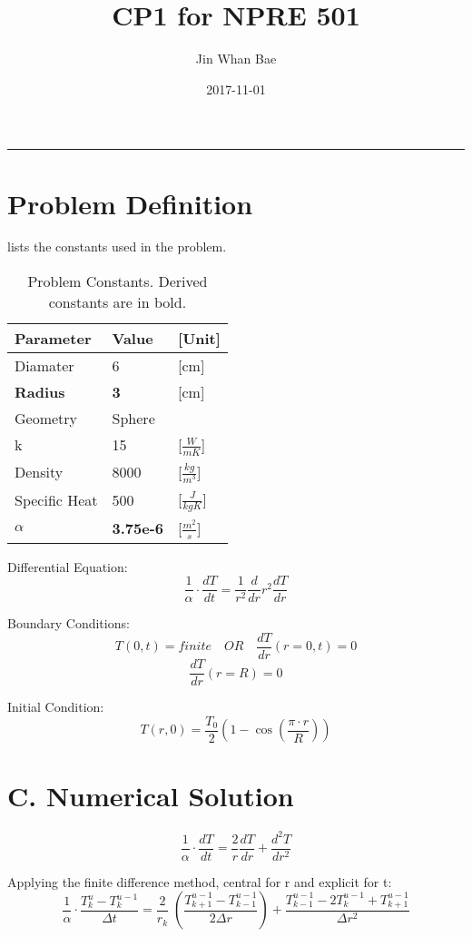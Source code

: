 \documentclass[12pt,letterpaper]{article}
\title{CP1 for NPRE 501}
\author{Jin Whan Bae}
\date{2017-11-01}
\begin{document}
	
	\maketitle
	\hrule
	\onehalfspacing
	\thispagestyle{empty}

\section{Problem Definition}

 lists the constants used in the problem.


\begin{table}[h]
     \centering
    \begin{tabularx}{\textwidth}{bbb}
       \hline
       Parameter & Value & [Unit] \\
       \hline
       Diamater & 6 & [cm] \\
       \textbf{Radius} & \textbf{3} & [cm] \\
       Geometry & Sphere \\
       k & 15 & [$ \frac{W}{mK} $] \\
       Density & 8000 & [$ \frac{kg}{m^3} $] \\
       Specific Heat & 500 & [$ \frac{J}{kgK} $] \\
       \textbf{$ \alpha$} & \textbf{3.75e-6} & [$ \frac{m^2}{s} $] \\
       \hline
    \end{tabularx}
    \caption {Problem Constants. Derived constants are in bold.}
    \label{tab:constants}
\end{table}

Differential Equation:
\[\frac{1}{\alpha} \cdot \frac{dT}{dt} = \frac{1}{r^2} \frac{d}{dr} r^2 \frac{dT}{dr}\]

Boundary Conditions:
\[T(0,t) = finite \quad OR \quad \frac{dT}{dr} (r = 0, t) = 0\]
\[\frac{dT}{dr} (r = R) = 0 \]

Initial Condition:
\[T(r,0) = \frac{T_0}{2} (1-\cos{(\frac{\pi \cdot r}{R})}) \]

\section{C. Numerical Solution}


\[\frac{1}{\alpha} \cdot \frac{dT}{dt} = \frac{2}{r} \frac{dT}{dr} + \frac{d^2T}{dr^2}\]

Applying the finite difference method, central for r and explicit for t:
\[\frac{1}{\alpha} \cdot \frac{T_k^{u} - T_k^{u-1}}{\Delta t} = \frac{2}{r_k} \; (\frac{T^{u-1}_{k+1}-T^{u-1}_{k-1}}{2 \Delta r}) + \frac{T^{u-1}_{k-1} - 2T^{u-1}_k + T^{u-1}_{k+1}}{\Delta r^2}\]
\end{document}
